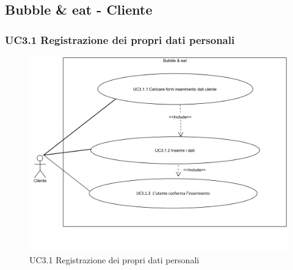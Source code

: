 \subsection{Bubble \& eat - Cliente}

\subsubsection{UC3.1 Registrazione dei propri dati personali} \label{UC3.1}

\begin{figure}[H]
	\centering
	\includegraphics[width=15cm]{../../documenti/AnalisiDeiRequisiti/Diagrammi_img/uc3_1.png}
	\caption{UC3.1 Registrazione dei propri dati personali}
\end{figure}

